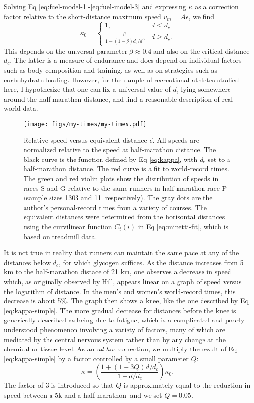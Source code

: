 \documentclass[10pt,letterpaper]{article}
\begin{document}
Solving Eq \ref{eq:fuel-model-1}-\ref{eq:fuel-model-3} and expressing $\kappa$ as a correction factor
relative to the short-distance maximum speed $v_m=A\epsilon$, we find
\begin{equation}\label{eq:kappa-simple}
  \kappa_0 = \begin{cases}
    1, & d\le d_c \\
    \frac{\beta}{1-(1-\beta)d_c/d}, & d\ge d_c.
  \end{cases}
\end{equation}
This depends on the universal parameter $\beta\approx0.4$ and also on the critical distance $d_c$.
The latter is a measure of endurance and does depend on individual factors such as
body composition and training, as well as on strategies such as carbohydrate loading.
However, for the sample of recreational athletes studied here, I hypothesize that one can fix a universal value of $d_c$ lying somewhere
around the half-marathon distance, and find a reasonable description of
real-world data.

\begin{figure}[h]
\texttt{[image: figs/my-times/my-times.pdf]}
\centering
\caption{Relative speed versus equivalent distance $d$. All speeds are normalized relative to the speed at half-marathon distance.
The black curve is the function defined by Eq \ref{eq:kappa}, with $d_c$ set to a half-marathon distance.
The red curve is a 
fit to world-record times.\cite{cameron} 
The green and red violin plots show the distribution of speeds in races S and G relative to the same runners
in half-marathon race P (sample sizes 1303 and 11, respectively).
The gray dots are the author's personal-record times from a variety of courses.
The equivalent distances were determined from the horizontal distances using the curvilinear
function $C_t(i)$ in Eq \ref{eq:minetti-fit}, which is based on treadmill data. }
\label{fig:my-times}
\end{figure}

It is not true in reality that runners can maintain the same pace at any of the distances below
$d_c$, for which glycogen suffices. As the distance increases from 5 km to the half-marathon
distace of 21 km, one observes a decrease in speed which, as originally observed by Hill,\cite{hill} appears
linear on a graph of speed versus the logarithm of distance. In the men's and women's world-record
times, this decrease is about 5\%. The graph then shows a knee, like the one described by Eq \ref{eq:kappa-simple}.
The more gradual decrease for distances before the knee is generically described as being due to fatigue, which is
a complicated and poorly understood phenomenon involving a variety of factors, many of which are mediated
by the central nervous system rather than by any change at the chemical or tissue level. As an \emph{ad hoc}
correction, we multiply the result of Eq \ref{eq:kappa-simple} by a factor
controlled by a small parameter $Q$:
\begin{equation}\label{eq:kappa}
  \kappa = \left(\frac{1+(1-3Q)d/d_c}{1+d/d_c}\right) \kappa_0.
\end{equation}
The factor of 3 is introduced so that $Q$ is approximately equal to the reduction in speed between a 5k and a half-marathon,
and we set $Q=0.05$.
\end{document}
